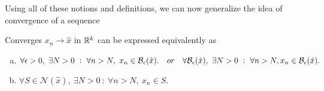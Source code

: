Using all of these notions and definitions, we can now generalize the idea of convergence of a sequence
\begin{proposition}
	Converges $x_n \to \hat{x}$ in $\mathbb{R}^k$ can be expressed equivalently as 
	\begin{enumerate}[(a)]
		\item $\forall \epsilon>0,\ \exists N>0\ :\ \forall n>N,\ x_n \in \mathcal{B}_{\epsilon}(\hat{x}). \quad or \quad \forall \mathcal{B}_{\epsilon}(\hat{x}),\ \exists N>0\ :\ \forall n>N, x_n \in \mathcal{B}_{\epsilon}(\hat{x}). $
		\item $\forall S \in \mathcal{N}(\hat{x}),\ \exists N>0\ :\ \forall n>N,\ x_n \in S.$
	\end{enumerate}
\end{proposition}




